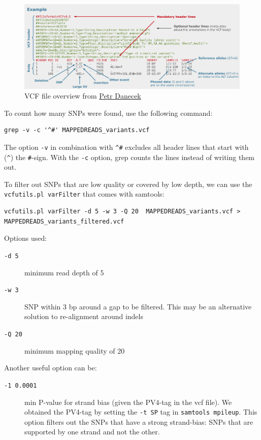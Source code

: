 \documentclass[11pt]{article}
\begin{document}
\begin{figure}[htb]
\centering
\includegraphics[width=17cm]{DanecekVcfFile.png}
\caption{\label{fig:vcf}VCF file overview from \href{http://vcftools.sourceforge.net/VCF-poster.pdf}{Petr Danecek}}
\end{figure}



To count how many SNPs were found, use the following command:

\begin{verbatim}
grep -v -c '^#' MAPPEDREADS_variants.vcf
\end{verbatim}

The option \texttt{-v} in combination with \texttt{\textasciicircum{}\#} excludes all header lines
that start with (\texttt{\textasciicircum{}}) the \texttt{\#}-sign. With the \texttt{-c} option, grep counts
the lines instead of writing them out.


To filter out SNPs that are low quality or covered by low depth, we
can use the \texttt{vcfutils.pl varFilter} that comes with samtools:

\begin{verbatim}
vcfutils.pl varFilter -d 5 -w 3 -Q 20  MAPPEDREADS_variants.vcf > MAPPEDREADS_variants_filtered.vcf
\end{verbatim}


Options used:
\begin{description}
\item[{\texttt{-d 5}}] minimum read depth of 5
\item[{\texttt{-w 3}}] SNP within 3 bp around a gap to be filtered. This may be
an alternative solution to re-alignment around indels
\item[{\texttt{-Q 20}}] minimum mapping quality of 20
\end{description}

Another useful option can be:
\begin{description}
\item[{\texttt{-1 0.0001}}] min P-value for strand bias (given the PV4-tag in the
vcf file). We obtained the PV4-tag by setting the \texttt{-t SP} tag in
\texttt{samtools mpileup}. This option filters out the SNPs that have a
strong strand-bias: SNPs that are supported by one strand and not
the other.
\end{description}
\end{document}
